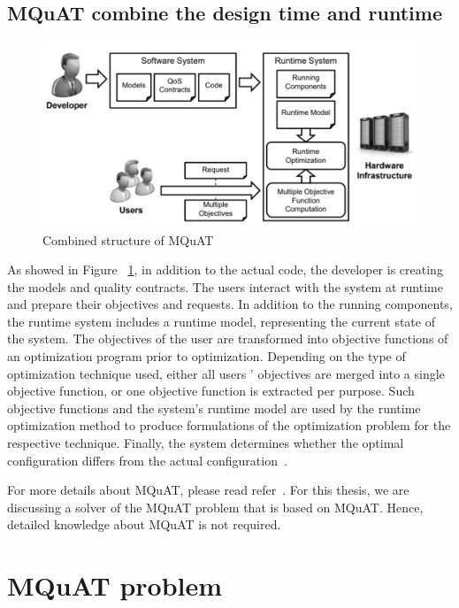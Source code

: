 \subsection{MQuAT combine the design time and runtime}

\begin{figure}
	\centering
	\includegraphics[width=\textwidth]{images/CombinedMQuAT}
	\caption[Combined structure of MQuAT]{Combined structure of MQuAT}
	\label{fig:CombinedMQuAT}
\end{figure}

As showed in Figure ~\ref{fig:CombinedMQuAT}, in addition to the actual code, the developer is creating the models and quality contracts. The users interact with the system at runtime and prepare their objectives and requests. 
In addition to the running components, the runtime system includes a runtime model, representing the current state of the system. The objectives of the user are transformed into objective functions of an optimization program prior to optimization. Depending on the type of optimization technique used, either all users ' objectives are merged into a single objective function, or one objective function is extracted per purpose. Such objective functions and the system's runtime model are used by the runtime optimization method to produce formulations of the optimization problem for the respective technique. Finally, the system determines whether the optimal configuration differs from the actual configuration~\cite{gotz13, ahmad18}.

For more details about MQuAT, please read refer~\cite{gotz13}. For this thesis, we are discussing a solver of the MQuAT problem that is based on MQuAT. Hence, detailed knowledge about MQuAT is not required. 


\section{MQuAT problem}

